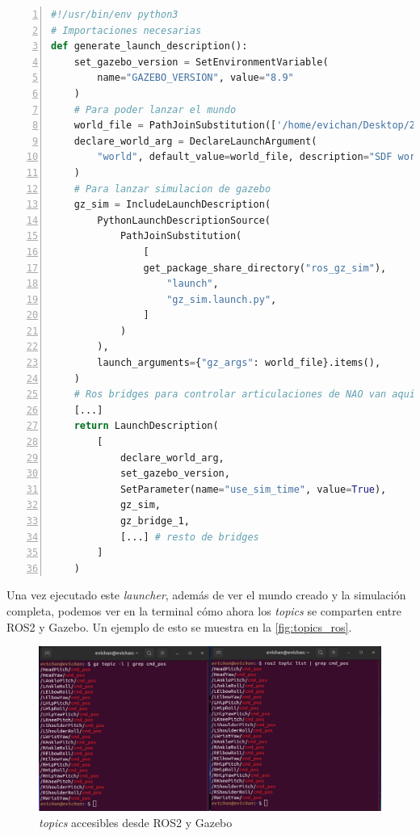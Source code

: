\begin{lstlisting}[language=Python, caption={Ejemplo de launcher para simulación}, label={lst:launcher}, numbers=left, backgroundcolor=\color{gray!10}]    
#!/usr/bin/env python3
# Importaciones necesarias
def generate_launch_description():
    set_gazebo_version = SetEnvironmentVariable(
        name="GAZEBO_VERSION", value="8.9"
    )
    # Para poder lanzar el mundo
    world_file = PathJoinSubstitution(['/home/evichan/Desktop/2024-tfg-eva-fernandez/GreenNao/greennao/worlds/greenhouse_world', 'greenhouse_world.sdf'])
    declare_world_arg = DeclareLaunchArgument(
        "world", default_value=world_file, description="SDF world file"
    )
    # Para lanzar simulacion de gazebo
    gz_sim = IncludeLaunchDescription(
        PythonLaunchDescriptionSource(
            PathJoinSubstitution(
                [
                get_package_share_directory("ros_gz_sim"),
                    "launch",
                    "gz_sim.launch.py",
                ]
            )
        ),
        launch_arguments={"gz_args": world_file}.items(),
    )
    # Ros bridges para controlar articulaciones de NAO van aqui, uno por grado de libertad
    [...]
    return LaunchDescription(
        [
            declare_world_arg,
            set_gazebo_version,
            SetParameter(name="use_sim_time", value=True),
            gz_sim,
            gz_bridge_1,
            [...] # resto de bridges
        ]
    )
\end{lstlisting}

Una vez ejecutado este \textit{launcher}, además de ver el mundo creado y la simulación completa, podemos ver en la terminal cómo ahora los \textit{topics} se comparten entre ROS2 y Gazebo. Un ejemplo de esto se muestra en la \autoref{fig:topics_ros}.

\begin{figure}[H]
  \centering
  \includegraphics[width=1\textwidth]{figures/cap_4/topics_ros.png}
  \caption{\textit{topics} accesibles desde ROS2 y Gazebo}
  \label{fig:topics_ros}
\end{figure}

